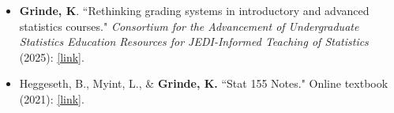 \documentclass[margin]{res}
\newcommand{\annotateItem}[1]{
	\begin{itemize} \vspace{-0.1cm}
	\item[] 
	\begin{footnotesize}\textcolor{black}{(#1)}\end{footnotesize}
	\end{itemize} \vspace{-0.1cm}
}
\begin{document}
\begin{resume}
\begin{itemize}
\item[2.] \textbf{Grinde, K}. ``Rethinking grading systems in introductory and advanced statistics courses." \textit{Consortium for the Advancement of Undergraduate Statistics Education Resources for JEDI-Informed Teaching of Statistics} (2025): \href{https://causeweb.org/jedi/post/rethinking-grading-systems}{[link]}.

\item[1.] Heggeseth, B., Myint, L., \& \textbf{Grinde, K.} ``Stat 155 Notes." 
Online textbook (2021): \href{https://mac-stat.github.io/Stat155Notes/}{[link]}.  

\end{itemize}



\end{resume}
\end{document}

